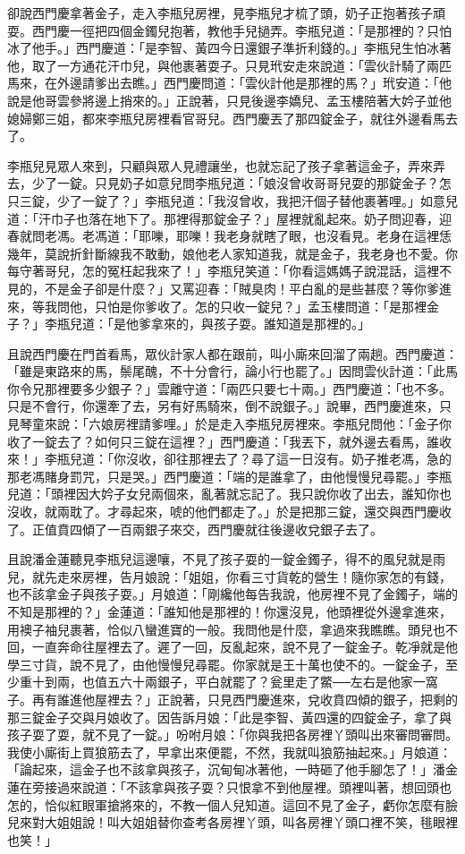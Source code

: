 卻說西門慶拿著金子，走入李瓶兒房裡，見李瓶兒才梳了頭，奶子正抱著孩子頑耍。西門慶一徑把四個金鐲兒抱著，教他手兒撾弄。李瓶兒道：「是那裡的？只怕冰了他手。」西門慶道：「是李智、黃四今日還銀子準折利錢的。」李瓶兒生怕冰著他，取了一方通花汗巾兒，與他裹著耍子。只見玳安走來說道：「雲伙計騎了兩匹馬來，在外邊請爹出去瞧。」西門慶問道：「雲伙計他是那裡的馬？」玳安道：「他說是他哥雲參將邊上捎來的。」正說著，只見後邊李嬌兒、孟玉樓陪著大妗子並他媳婦鄭三姐，都來李瓶兒房裡看官哥兒。西門慶丟了那四錠金子，就往外邊看馬去了。

李瓶兒見眾人來到，只顧與眾人見禮讓坐，也就忘記了孩子拿著這金子，弄來弄去，少了一錠。只見奶子如意兒問李瓶兒道：「娘沒曾收哥哥兒耍的那錠金子？怎只三錠，少了一錠了？」李瓶兒道：「我沒曾收，我把汗個子替他裹著哩。」如意兒道：「汗巾子也落在地下了。那裡得那錠金子？」屋裡就亂起來。奶子問迎春，迎春就問老馮。老馮道：「耶嚛，耶嚛！我老身就瞎了眼，也沒看見。老身在這裡恁幾年，莫說折針斷線我不敢動，娘他老人家知道我，就是金子，我老身也不愛。你每守著哥兒，怎的冤枉起我來了！」李瓶兒笑道：「你看這媽媽子說混話，這裡不見的，不是金子卻是什麼？」又罵迎春：「賊臭肉！平白亂的是些甚麼？等你爹進來，等我問他，只怕是你爹收了。怎的只收一錠兒？」孟玉樓問道：「是那裡金子？」李瓶兒道：「是他爹拿來的，與孩子耍。誰知道是那裡的。」

且說西門慶在門首看馬，眾伙計家人都在跟前，叫小廝來回溜了兩趟。西門慶道：「雖是東路來的馬，鬃尾醜，不十分會行，論小行也罷了。」因問雲伙計道：「此馬你令兄那裡要多少銀子？」雲離守道：「兩匹只要七十兩。」西門慶道：「也不多。只是不會行，你還牽了去，另有好馬騎來，倒不說銀子。」說畢，西門慶進來，只見琴童來說：「六娘房裡請爹哩。」於是走入李瓶兒房裡來。李瓶兒問他：「金子你收了一錠去了？如何只三錠在這裡？」西門慶道：「我丟下，就外邊去看馬，誰收來！」李瓶兒道：「你沒收，卻往那裡去了？尋了這一日沒有。奶子推老馮，急的那老馮賭身罰咒，只是哭。」西門慶道：「端的是誰拿了，由他慢慢兒尋罷。」李瓶兒道：「頭裡因大妗子女兒兩個來，亂著就忘記了。我只說你收了出去，誰知你也沒收，就兩耽了。才尋起來，唬的他們都走了。」於是把那三錠，還交與西門慶收了。正值賁四傾了一百兩銀子來交，西門慶就往後邊收兌銀子去了。

且說潘金蓮聽見李瓶兒這邊嚷，不見了孩子耍的一錠金鐲子，得不的風兒就是雨兒，就先走來房裡，告月娘說：「姐姐，你看三寸貨乾的營生！隨你家怎的有錢，也不該拿金子與孩子耍。」月娘道：「剛纔他每告我說，他房裡不見了金鐲子，端的不知是那裡的？」金蓮道：「誰知他是那裡的！你還沒見，他頭裡從外邊拿進來，用襖子袖兒裹著，恰似八蠻進寶的一般。我問他是什麼，拿過來我瞧瞧。頭兒也不回，一直奔命往屋裡去了。遲了一回，反亂起來，說不見了一錠金子。乾凈就是他學三寸貨，說不見了，由他慢慢兒尋罷。你家就是王十萬也使不的。一錠金子，至少重十到兩，也值五六十兩銀子，平白就罷了？瓮里走了鱉──左右是他家一窩子。再有誰進他屋裡去？」正說著，只見西門慶進來，兌收賁四傾的銀子，把剩的那三錠金子交與月娘收了。因告訴月娘：「此是李智、黃四還的四錠金子，拿了與孩子耍了耍，就不見了一錠。」吩咐月娘：「你與我把各房裡丫頭叫出來審問審問。我使小廝街上買狼筋去了，早拿出來便罷，不然，我就叫狼筋抽起來。」月娘道：「論起來，這金子也不該拿與孩子，沉甸甸冰著他，一時砸了他手腳怎了！」潘金蓮在旁接過來說道：「不該拿與孩子耍？只恨拿不到他屋裡。頭裡叫著，想回頭也怎的，恰似紅眼軍搶將來的，不教一個人兒知道。這回不見了金子，虧你怎麼有臉兒來對大姐姐說！叫大姐姐替你查考各房裡丫頭，叫各房裡丫頭口裡不笑，毴眼裡也笑！」

